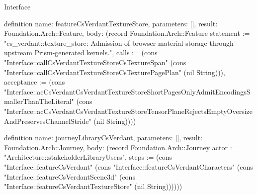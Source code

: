 \begin{lexlean}{Interface}
\begin{semanticmodule}
definition{
  name: featureCsVerdantTextureStore,
  parameters: [],
  result: Foundation.Arch::Feature,
  body: (record Foundation.Arch::Feature {statement := "cs_verdant::texture_store: Admission of browser material storage through upstream Prism-generated kernels.", calls := (cons "Interface::callCsVerdantTextureStoreCsTextureSpan" (cons "Interface::callCsVerdantTextureStoreCsTexturePagePlan" (nil String))), acceptance := (cons "Interface::acCsVerdantCsVerdantTextureStoreShortPagesOnlyAdmitEncodingsSmallerThanTheLiteral" (cons "Interface::acCsVerdantCsVerdantTextureStoreTensorPlaneRejectsEmptyOversizeAndPreservesChannelStride" (nil String)))})
}

definition{
  name: journeyLibraryCsVerdant,
  parameters: [],
  result: Foundation.Arch::Journey,
  body: (record Foundation.Arch::Journey {actor := "Architecture::stakeholderLibraryUsers", steps := (cons "Interface::featureCsVerdant" (cons "Interface::featureCsVerdantCharacters" (cons "Interface::featureCsVerdantScene3d" (cons "Interface::featureCsVerdantTextureStore" (nil String)))))})
}
\end{semanticmodule}
\end{lexlean}
